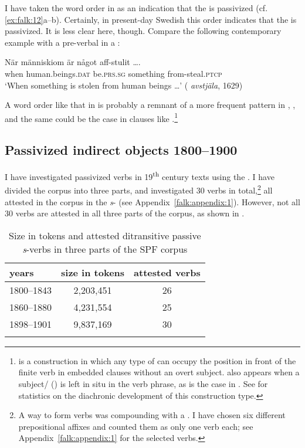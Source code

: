 \documentclass[output=paper]{langscibook}
\begin{document}
I have taken the word order in  as an indication that the  is passivized (cf. \ref{ex:falk:12}a–b). Certainly, in present-day Swedish this order indicates that the  is passivized. It is less clear here, though. Compare the following contemporary example with a pre-verbal   in a :\largerpage

\ea%
    \label{ex:falk:18}
\gll När  människiom      är        något      aff-stulit …. \\
    when  human.beings\textsc{.dat}  be.\textsc{prs.sg}  something  from-steal.\textsc{ptcp}\\
\glt ‘When something is stolen from human beings …’ ( \textit{avstjäla}, 1629)
\z


A word order like that in  is probably a remnant of a more frequent pattern in , , and the same could be the case in clauses like .\footnote{ is a construction in which any type of  can occupy the position in front of the finite verb in embedded clauses without an overt subject.  also appears when a subject/ () is left in situ in the verb phrase, as is the case in . See \citet[326]{Falk1993} for statistics on the diachronic development of this construction type.}

\subsection{Passivized indirect objects 1800–1900}\label{sec:falk:3.5}


I have investigated passivized  verbs in 19\textsuperscript{th} century texts using the . I have divided the corpus into three parts, and investigated 30  verbs in total,\footnote{A  way to form  verbs was compounding with a . I have chosen six different prepositional affixes and counted them as only one verb each; see Appendix~\ref{falk:appendix:1} for the selected verbs.\label{fn:02:15}} all attested in the corpus in the \textit{s}{}- (see Appendix~\ref{falk:appendix:1}). However, not all 30 verbs are attested in all three parts of the corpus, as shown in .

\begin{table}
\caption{Size in tokens and attested ditransitive passive \textit{s}{}-verbs in three parts of the SPF corpus\label{tab:falk:1}}
\begin{tabular}{lcc}
\lsptoprule
years & size in tokens & attested verbs\\\midrule
1800–1843 & 2,203,451 & 26\\
1860–1880 & 4,231,554 & 25\\
1898–1901 & 9,837,169 & 30\\
\lspbottomrule
\end{tabular}
\end{table}
\end{document}
